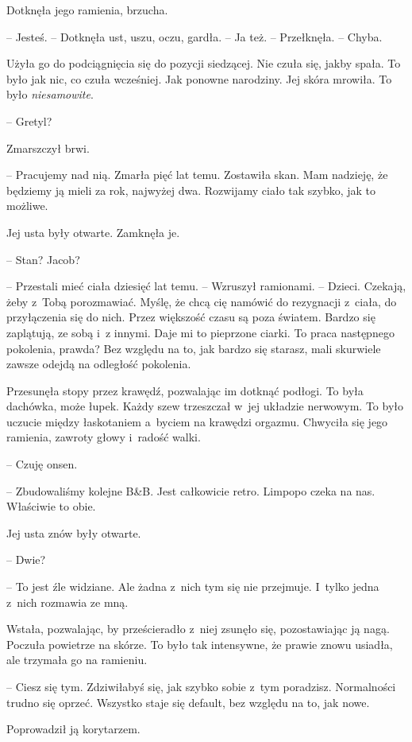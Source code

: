 \documentclass[oneside,polish,11pt,sfheadings]{mwbk}
\begin{document}
Dotknęła jego ramienia, brzucha. 

-- Jesteś. -- Dotknęła ust, uszu, oczu,
gardła. -- Ja też. -- Przełknęła. -- Chyba.

Użyła go do podciągnięcia się do pozycji siedzącej. Nie czuła się, jakby
spała. To było jak nic, co czuła wcześniej. Jak ponowne narodziny. Jej
skóra mrowiła. To było \textit{niesamowite}.

-- Gretyl?

Zmarszczył brwi. 

-- Pracujemy nad nią. Zmarła pięć lat temu. Zostawiła
skan. Mam nadzieję, że będziemy ją mieli za rok, najwyżej dwa. Rozwijamy
ciało tak szybko, jak to możliwe.

Jej usta były otwarte. Zamknęła je. 

-- Stan? Jacob?

-- Przestali mieć ciała dziesięć lat temu. -- Wzruszył ramionami. -- Dzieci. Czekają, żeby z~Tobą porozmawiać. Myślę, że chcą cię namówić do
rezygnacji z~ciała, do przyłączenia się do nich. Przez większość czasu
są poza światem. Bardzo się zaplątują, ze sobą i~z innymi. Daje mi to
pieprzone ciarki. To praca następnego pokolenia, prawda? Bez względu na
to, jak bardzo się starasz, mali skurwiele zawsze odejdą na odległość
pokolenia.

Przesunęła stopy przez krawędź, pozwalając im dotknąć podłogi. To była
dachówka, może łupek. Każdy szew trzeszczał w~jej układzie nerwowym. To
było uczucie między łaskotaniem a~byciem na krawędzi orgazmu. Chwyciła
się jego ramienia, zawroty głowy i~radość walki.

-- Czuję onsen.

-- Zbudowaliśmy kolejne B\&B. Jest całkowicie retro. Limpopo czeka na
nas. Właściwie to obie.

Jej usta znów były otwarte. 

-- Dwie?

-- To jest źle widziane. Ale żadna z~nich tym się nie przejmuje. I~tylko
jedna z~nich rozmawia ze mną.

Wstała, pozwalając, by prześcieradło z~niej zsunęło się, pozostawiając
ją nagą. Poczuła powietrze na skórze. To było tak intensywne, że prawie
znowu usiadła, ale trzymała go na ramieniu.

-- Ciesz się tym. Zdziwiłabyś się, jak szybko sobie z~tym poradzisz.
Normalności trudno się oprzeć. Wszystko staje się default, bez względu
na to, jak nowe.

Poprowadził ją korytarzem.
\end{document}
